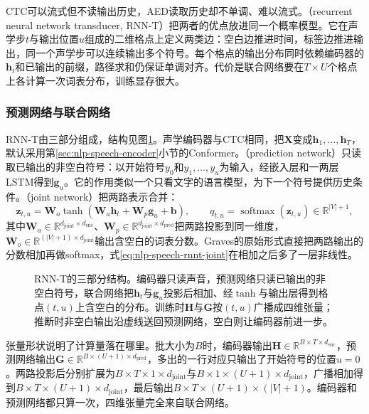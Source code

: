 CTC可以流式但不读输出历史，AED读取历史却不单调、难以流式。（recurrent neural network transducer, RNN-T）把两者的优点放进同一个概率模型。它在声学步$t$与输出位置$u$组成的二维格点上定义两类边：空白边推进时间，标签边推进输出，同一个声学步可以连续输出多个符号。每个格点的输出分布同时依赖编码器的$\bm{h}_t$和已输出的前缀，路径求和仍保证单调对齐。代价是联合网络要在$T\times U$个格点上各计算一次词表分布，训练显存很大。

\subsubsection{预测网络与联合网络}
\label{sec:nlp-speech-rnnt-networks}

RNN-T由三部分组成，结构见图\ref{fig:nlp-speech-rnnt-structure}。声学编码器与CTC相同，把$\bm{X}$变成$\bm{h}_1,\ldots,\bm{h}_T$，默认采用第\ref{sec:nlp-speech-encoder}小节的Conformer。（prediction network）只读取已输出的非空白符号：以开始符号$y_0$和$y_1,\ldots,y_u$为输入，经嵌入层和一两层LSTM得到$\bm{g}_u$。它的作用类似一个只看文字的语言模型，为下一个符号提供历史条件。（joint network）把两路表示合并：
\begin{equation}
 \bm{z}_{t,u}=\bm{W}_o\tanh(\bm{W}_a\bm{h}_t+\bm{W}_p\bm{g}_u+\bm{b}),\qquad
 q_{t,u}=\operatorname{softmax}(\bm{z}_{t,u})\in\mathbb{R}^{|V|+1},
 \label{eq:nlp-speech-rnnt-joint}
\end{equation}
其中$\bm{W}_a\in\mathbb{R}^{d_{\mathrm{joint}}\times d_{\mathrm{enc}}}$、$\bm{W}_p\in\mathbb{R}^{d_{\mathrm{joint}}\times d_{\mathrm{pred}}}$把两路投影到同一维度，$\bm{W}_o\in\mathbb{R}^{(|V|+1)\times d_{\mathrm{joint}}}$输出含空白的词表分数。Graves的原始形式直接把两路输出的分数相加再做softmax，式\eqref{eq:nlp-speech-rnnt-joint}在相加之后多了一层非线性。

\begin{figure}[htbp]
  \centering
  
  \caption{RNN-T的三部分结构。编码器只读声音，预测网络只读已输出的非空白符号，联合网络把$\bm{h}_t$与$\bm{g}_u$投影后相加、经$\tanh$与输出层得到格点$(t,u)$上含空白的分布。训练时$\bm{H}$与$\bm{G}$按$(t,u)$广播成四维张量；推断时非空白输出沿虚线送回预测网络，空白则让编码器前进一步。}
  \label{fig:nlp-speech-rnnt-structure}
\end{figure}

张量形状说明了计算量落在哪里。批大小为$B$时，编码器输出$\bm{H}\in\mathbb{R}^{B\times T\times d_{\mathrm{enc}}}$，预测网络输出$\bm{G}\in\mathbb{R}^{B\times(U+1)\times d_{\mathrm{pred}}}$，多出的一行对应只输出了开始符号的位置$u=0$。两路投影后分别扩展为$B\times T\times1\times d_{\mathrm{joint}}$与$B\times1\times(U+1)\times d_{\mathrm{joint}}$，广播相加得到$B\times T\times(U+1)\times d_{\mathrm{joint}}$，最后输出$B\times T\times(U+1)\times(|V|+1)$。编码器和预测网络都只算一次，四维张量完全来自联合网络。


